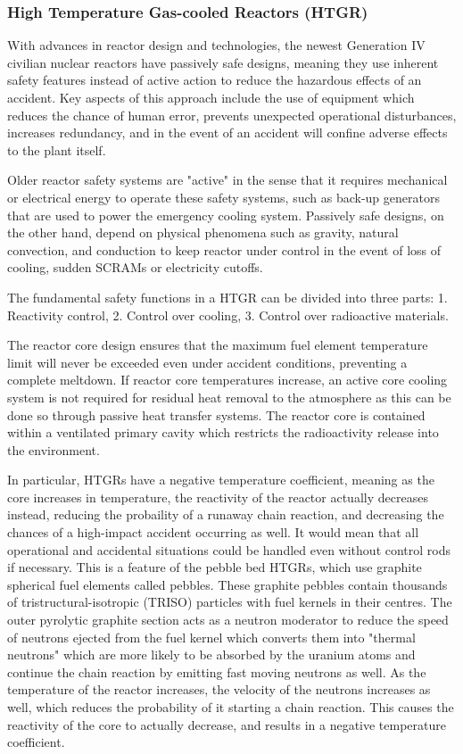 \documentclass{article}
\begin{document}
\subsubsection{High Temperature Gas-cooled Reactors (HTGR)}
With advances in reactor design and technologies, the newest Generation IV civilian nuclear reactors have passively safe designs, meaning they use inherent safety features instead of active action to reduce the hazardous effects of an accident. Key aspects of this approach include the use of equipment which reduces the chance of human error, prevents unexpected operational disturbances, increases redundancy, and in the event of an accident will confine adverse effects to the plant itself. 

Older reactor safety systems are "active" in the sense that it requires mechanical or electrical energy to operate these safety systems, such as back-up generators that are used to power the emergency cooling system. Passively safe designs, on the other hand, depend on physical phenomena such as gravity, natural convection, and conduction to keep reactor under control in the event of loss of cooling, sudden SCRAMs or electricity cutoffs.  

The fundamental safety functions in a HTGR can be divided into three parts: 1. Reactivity control, 2. Control over cooling, 3. Control over radioactive materials. 

The reactor core design ensures that the maximum fuel element temperature limit will never be exceeded even under accident conditions, preventing a complete meltdown. If reactor core temperatures increase, an active core cooling system is not required for residual heat removal to the atmosphere as this can be done so through passive heat transfer systems. The reactor core is contained within a ventilated primary cavity which restricts the radioactivity
release into the environment. 

In particular, HTGRs have a negative temperature coefficient, meaning as the core increases in temperature, the reactivity of the reactor actually decreases instead, reducing the probaility of a runaway chain reaction, and decreasing the chances of a high-impact accident occurring as well. It would mean that all operational and accidental situations could be handled even without control rods if necessary. This is a feature of the pebble bed HTGRs, which use graphite spherical fuel elements called pebbles. These graphite pebbles contain thousands of tristructural-isotropic (TRISO) particles with fuel kernels in their centres. The outer pyrolytic graphite section acts as a neutron moderator to reduce the speed of neutrons ejected from the fuel kernel which converts them into "thermal neutrons" which are more likely to be absorbed by the uranium atoms and continue the chain reaction by emitting fast moving neutrons as well. As the temperature of the reactor increases, the velocity of the neutrons increases as well, which reduces the probability of it starting a chain reaction. This causes the reactivity of the core to actually decrease, and results in a negative temperature coefficient. 
\end{document}
